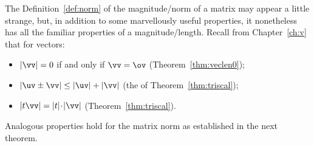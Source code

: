The Definition~\ref{def:norm} of the magnitude\slash norm of a matrix may appear a little strange, but, in addition to some marvellously useful properties, it nonetheless has all the familiar properties of a magnitude\slash length.
Recall from Chapter~\ref{ch:v} that for vectors:
\begin{itemize}
\item \(|\vv|=0\) if and only if \(\vv=\ov\) (Theorem~\ref{thm:veclen0});
\item \(|\uv\pm\vv|\leq|\uv|+|\vv|\) (the  of Theorem~\ref{thm:triscal});
\item \(|t\vv|=|t|\cdot|\vv|\) (Theorem~\ref{thm:triscal}).
\end{itemize}
Analogous properties hold for the matrix norm as established in the next theorem.




